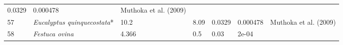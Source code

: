 \documentclass[]{article}
\begin{document}
\begin{longtable}[]{@{}lllllll@{}}
\begin{minipage}[t]{0.08\columnwidth}
0.0329\strut
\end{minipage} & \begin{minipage}[t]{0.08\columnwidth}\raggedright
0.000478\strut
\end{minipage} & \begin{minipage}[t]{0.23\columnwidth}\raggedright
Muthoka et al. (2009)\strut
\end{minipage}\tabularnewline
\begin{minipage}[t]{0.05\columnwidth}\raggedright
57\strut
\end{minipage} & \begin{minipage}[t]{0.23\columnwidth}\raggedright
\emph{Eucalyptus quinquecostata}*\strut
\end{minipage} & \begin{minipage}[t]{0.05\columnwidth}\raggedright
10.2\strut
\end{minipage} & \begin{minipage}[t]{0.08\columnwidth}\raggedright
8.09\strut
\end{minipage} & \begin{minipage}[t]{0.08\columnwidth}\raggedright
0.0329\strut
\end{minipage} & \begin{minipage}[t]{0.08\columnwidth}\raggedright
0.000478\strut
\end{minipage} & \begin{minipage}[t]{0.23\columnwidth}\raggedright
Muthoka et al. (2009)\strut
\end{minipage}\tabularnewline
\begin{minipage}[t]{0.05\columnwidth}\raggedright
58\strut
\end{minipage} & \begin{minipage}[t]{0.23\columnwidth}\raggedright
\emph{Festuca ovina}\strut
\end{minipage} & \begin{minipage}[t]{0.05\columnwidth}\raggedright
4.366\strut
\end{minipage} & \begin{minipage}[t]{0.08\columnwidth}\raggedright
0.5\strut
\end{minipage} & \begin{minipage}[t]{0.08\columnwidth}\raggedright
0.03\strut
\end{minipage} & \begin{minipage}[t]{0.08\columnwidth}\raggedright
2e-04\strut
\end{minipage} & \begin{minipage}[t]{0.23\columnwidth}\raggedright

\end{minipage}
\end{longtable}
\end{document}
